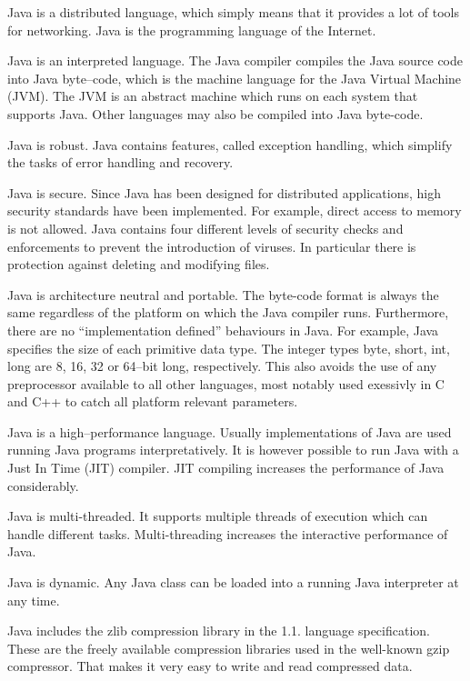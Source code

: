 Java is a distributed language, which simply means that it provides a lot of 
tools for networking. Java is the programming language of the Internet.

Java is an interpreted language. The Java compiler compiles the Java
source code into Java byte--code, which is the machine language for the Java
Virtual Machine (JVM). The JVM is an abstract machine which runs on each system
that supports Java. Other languages may also be compiled into Java byte-code.

Java is robust. Java contains features, called 
exception handling, which simplify the
tasks of error handling and recovery.

Java is secure. Since Java has been designed for distributed applications, 
high security standards have been implemented. For example, direct access to
memory is not allowed. Java contains four different levels of security 
checks and enforcements to prevent the introduction of viruses. 
In particular there is protection against deleting and modifying files.

Java is architecture neutral and portable. The byte-code format is always the 
same regardless of the platform on which the Java compiler runs. Furthermore,
there are no ``implementation defined'' behaviours in Java. For example, Java
specifies the size of each primitive data type. The integer 
types byte, short, int, long are 8, 16, 32 or 64--bit long, respectively.
This also avoids the use of any preprocessor available to all other
languages, most notably used exessivly in C and C++ to catch all
platform relevant parameters.

Java is a high--performance language. 
Usually implementations of Java are used running 
Java programs interpretatively. It is however possible to run Java with a 
Just In Time (JIT) compiler. JIT compiling increases the performance of Java 
considerably.

Java is multi-threaded. It supports multiple threads of execution which can 
handle different tasks. Multi-threading increases the interactive performance 
of Java.

Java is dynamic. Any Java class can be loaded into a running Java interpreter 
at any time.

Java includes the zlib compression library in the 1.1. language specification.
These are
the freely available compression libraries used in the well-known
gzip compressor.
That makes it very easy to write and read compressed data. 


